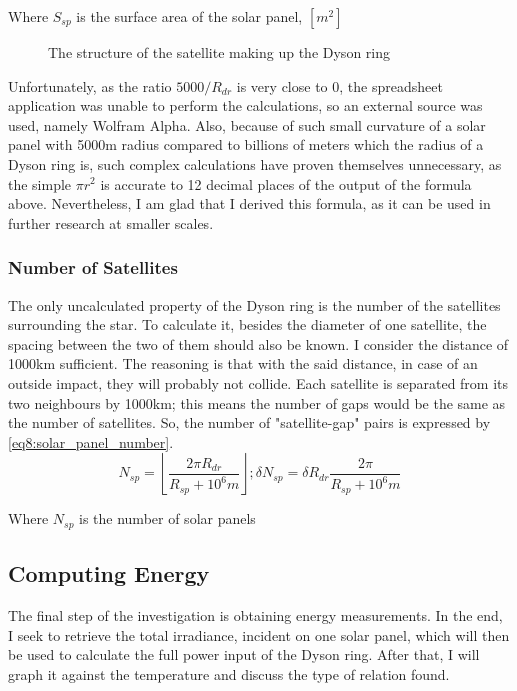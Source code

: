 \documentclass[stu, 11pt, a4paper, floatsintext, noextraspace]{apa7}
\begin{document}
	\begin{center}
		Where $S_{sp}$ is the surface area of the solar panel, $[m^2]$
	\end{center}
	\begin{figure}[h!]
		\centering
		\caption{The structure of the satellite making up the Dyson ring}
		\label{fig4:dyson_ring_satellite}
	\end{figure}
	Unfortunately, as the ratio $5000/R_{dr}$ is very close to 0, the spreadsheet application was unable to perform the calculations, so an external source was used, namely Wolfram Alpha. Also, because of such small curvature of a solar panel with 5000m radius compared to billions of meters which the radius of a Dyson ring is, such complex calculations have proven themselves unnecessary, as the simple $\pi r^2$ is accurate to 12 decimal places of the output of the formula above. Nevertheless, I am glad that I derived this formula, as it can be used in further research at smaller scales.
	\subsubsection{Number of Satellites}
	The only uncalculated property of the Dyson ring is the number of the satellites surrounding the star. To calculate it, besides the diameter of one satellite, the spacing between the two of them should also be known. I consider the distance of 1000km sufficient. The reasoning is that with the said distance, in case of an outside impact, they will probably not collide. Each satellite is separated from its two neighbours by 1000km; this means the number of gaps would be the same as the number of satellites. So, the number of "satellite-gap" pairs is expressed by \cref{eq8:solar_panel_number}.
	\begin{equation}
		\label{eq8:solar_panel_number}
		N_{sp}=\left\lfloor\frac{2\pi R_{dr}}{R_{sp} + 10^6m}\right\rfloor; \delta N_{sp}=\delta R_{dr}\frac{2\pi }{R_{sp} + 10^6m}
	\end{equation}
	\begin{center}
		Where $N_{sp}$ is the number of solar panels
	\end{center}
	\subsection{Computing Energy}
	The final step of the investigation is obtaining energy measurements. In the end, I seek to retrieve the total irradiance, incident on one solar panel, which will then be used to calculate the full power input of the Dyson ring. After that, I will graph it against the temperature and discuss the type of relation found.
\end{document}
